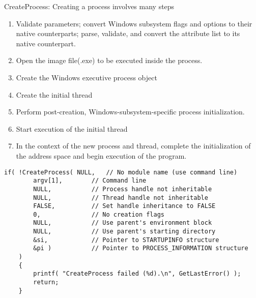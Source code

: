 \documentclass[letterpaper,10pt,draftclsnofoot,onecolumn]{IEEEtran}
\begin{document}
CreateProcess: Creating a process involves many steps
\begin{enumerate}
\item Validate parameters; convert Windows subsystem flags and options to their native counterparts; parse, validate, and convert the attribute list to its native counterpart.
\item Open the image file(.exe) to be executed inside the process.
\item Create the Windows executive process object
\item Create the initial thread
\item Perform post-creation, Windows-subsystem-specific process initialization.
\item Start execution of the initial thread
\item In the context of the new process and thread, complete the initialization of the address space and begin execution of the program.
\end{enumerate}
\begin{lstlisting}
if( !CreateProcess( NULL,   // No module name (use command line)
        argv[1],        // Command line
        NULL,           // Process handle not inheritable
        NULL,           // Thread handle not inheritable
        FALSE,          // Set handle inheritance to FALSE
        0,              // No creation flags
        NULL,           // Use parent's environment block
        NULL,           // Use parent's starting directory 
        &si,            // Pointer to STARTUPINFO structure
        &pi )           // Pointer to PROCESS_INFORMATION structure
    ) 
    {
        printf( "CreateProcess failed (%d).\n", GetLastError() );
        return;
    }
\end{lstlisting}
\end{document}
